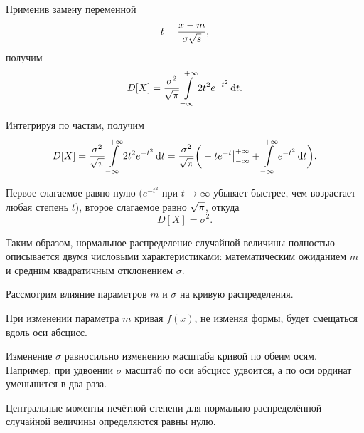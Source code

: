 \documentclass[a4paper]{article}
\newcommand{\sqrtt}[1]{\sqrt{\vphantom{qb} #1}}
\begin{document}
                    Применив замену переменной
                    \begin{equation*}
                        t = \frac{x - m}{\sigma \sqrtt{s}} ,
                    \end{equation*}
                    получим
                    \begin{equation*}
                        D[X] = \frac{\sigma^2}{\sqrtt{\pi}}
                            \int\limits_{-\infty}^{+\infty} 2 t^2 e^{-t^2} \dif t .
                    \end{equation*}

                    Интегрируя по частям, получим
                    \begin{equation*}
                        D[X] = \frac{\sigma^2}{\sqrtt{\pi}}
                            \int\limits_{-\infty}^{+\infty} 2 t^2 e^{-t^2} \dif t =
                            \frac{\sigma^2}{\sqrtt{\pi}}
                            \bigg( -t e^{-t} \big|_{-\infty}^{+\infty} +
                            \int\limits_{-\infty}^{+\infty} e^{-t^2} \dif t \bigg) .
                    \end{equation*}

                    Первое слагаемое равно нулю ($e^{-t^2}$ при $t \to \infty$ убывает быстрее, чем возрастает любая степень $t$), второе слагаемое равно $\sqrtt{\pi}$, откуда
                    \begin{equation*}
                        D[X] = \sigma^2 .
                    \end{equation*}

                    Таким образом, нормальное распределение случайной величины полностью описывается двумя числовыми характеристиками: математическим ожиданием $m$ и средним квадратичным отклонением $\sigma$.

                    Рассмотрим влияние параметров $m$ и $\sigma$ на кривую распределения.
                    
                    При изменении параметра $m$ кривая $f(x)$, не изменяя формы, будет смещаться вдоль оси абсцисс.
                    
                    Изменение $\sigma$ равносильно изменению масштаба кривой по обеим осям. Например, при удвоении $\sigma$ масштаб по оси абсцисс удвоится, а по оси ординат уменьшится в два раза.

                    Центральные моменты нечётной степени для нормально распределённой случайной величины определяются равны нулю.
                    
\end{document}
